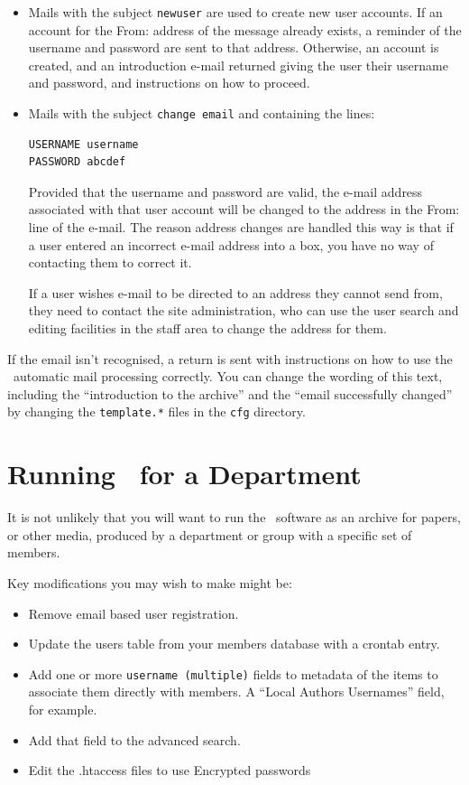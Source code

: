 \begin{itemize}
\item Mails with the subject {\tt newuser} are used to create new user accounts. If an account for the From: address of the message already exists, a reminder of the username and password are sent to that address. Otherwise, an account is created, and an introduction e-mail returned giving the user their username and password, and instructions on how to proceed.
\item Mails with the subject {\tt change email} and containing the lines:

\begin{verbatim}
USERNAME username
PASSWORD abcdef
\end{verbatim}

Provided that the username and password are valid, the e-mail address associated with that user account will be changed to the address in the From: line of the e-mail. The reason address changes are handled this way is that if a user entered an incorrect e-mail address into a box, you have no way of contacting them to correct it.

If a user wishes e-mail to be directed to an address they cannot send from, they need to contact the site administration, who can use the user search and editing facilities in the staff area to change the address for them.
\end{itemize}

If the email isn't recognised, a return is sent with instructions on how to use the \eprints\ automatic mail processing correctly. You can change the wording of this text, including the ``introduction to the archive'' and the ``email successfully changed'' by changing the {\tt template.*} files in the {\tt cfg} directory.

\section{Running \eprints\ for a Department}

It is not unlikely that you will want to run the \eprints\ software as an archive for papers, or other media,
produced by a department or group with a specific set of members.

Key modifications you may wish to make might be:

\begin{itemize}
\item Remove email based user registration.
\item Update the users table from your members database with a crontab entry.
\item Add one or more {\tt username (multiple)} fields to metadata of the items to associate them directly with members. A ``Local Authors Usernames'' field, for example.
\item Add that field to the advanced search.
\item Edit the .htaccess files to use Encrypted passwords
\end{itemize}

